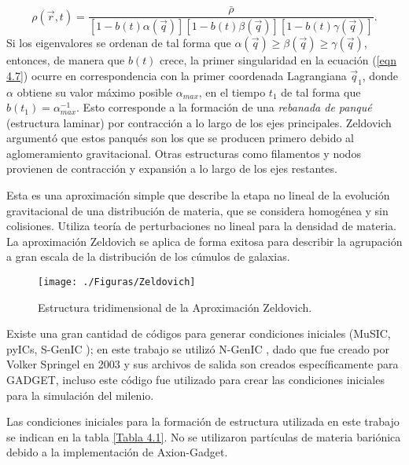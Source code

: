 \documentclass[a4paper,openright,12pt]{book}
\begin{document}
\begin{equation}
\rho(\vec{r}, t) = \frac{\bar{\rho}}{[1 - b(t)\alpha(\vec{q})][1 - b(t)\beta(\vec{q})][1 - b(t)\gamma(\vec{q})]}.\label{eqn 4.7}
\end{equation}
Si los eigenvalores se ordenan de tal forma que $\alpha(\vec{q})\geq \beta(\vec{q})\geq \gamma(\vec{q})$, entonces, de manera que $b(t)$ crece, la primer singularidad en la ecuación (\ref{eqn 4.7}) ocurre en correspondencia con la primer coordenada Lagrangiana $\vec{q}_{1}$, donde $\alpha$ obtiene su valor máximo posible $\alpha_{max}$, en el tiempo $t_{1}$ de tal forma que $b(t_{1}) = \alpha_{max}^{-1}$. Esto corresponde a la formación de una \textit{rebanada de panqué} (estructura laminar) por contracción a lo largo de los ejes principales. Zeldovich argumentó que estos panqués son los que se producen primero debido al aglomeramiento gravitacional. Otras estructuras como filamentos y nodos provienen de contracción y expansión a lo largo de los ejes restantes.

Esta es una aproximación simple que describe la etapa no lineal de la evolución gravitacional de una distribución de materia, que se considera homogénea y sin colisiones. Utiliza teoría de perturbaciones no lineal para la densidad de materia. La aproximación Zeldovich se aplica de forma exitosa para describir la agrupación a gran escala de la distribución de los cúmulos de galaxias.

\begin{figure}
\centering
\texttt{[image: ./Figuras/Zeldovich]}
\caption{\footnotesize{Estructura tridimensional de la Aproximación Zeldovich.}}\label{Zeld}
\end{figure}

Existe una gran cantidad de códigos para generar condiciones iniciales (MuSIC, pyICs, S-GenIC \cite{4.3}); en este trabajo se utilizó N-GenIC \cite{3.0.3}, dado que fue creado por Volker Springel en 2003 y sus archivos de salida son creados específicamente para GADGET, incluso este código fue utilizado para crear las condiciones iniciales para la simulación del milenio.

Las condiciones iniciales para la formación de estructura utilizada en este trabajo se indican en la tabla \ref{Tabla 4.1}. No se utilizaron partículas de materia bariónica debido a la implementación de Axion-Gadget.
\end{document}

